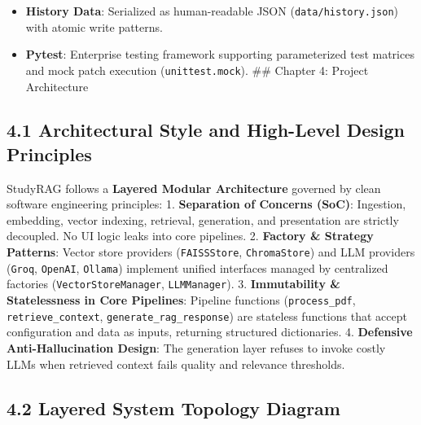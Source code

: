 \documentclass[
]{article}
\providecommand{\tightlist}{%
  \setlength{\itemsep}{0pt}\setlength{\parskip}{0pt}}
\begin{document}
\begin{itemize}
\tightlist
\item
  \textbf{History Data}: Serialized as human-readable JSON
  (\texttt{data/\allowbreak history.\allowbreak json}) with atomic write patterns.
\item
  \textbf{Pytest}: Enterprise testing framework supporting parameterized
  test matrices and mock patch execution (\texttt{unittest.\allowbreak mock}). \#\#
  Chapter 4: Project Architecture
\end{itemize}

\subsection{4.1 Architectural Style and High-Level Design
Principles}\label{architectural-style-and-high-level-design-principles}

StudyRAG follows a \textbf{Layered Modular Architecture} governed by
clean software engineering principles: 1. \textbf{Separation of Concerns
(SoC)}: Ingestion, embedding, vector indexing, retrieval, generation,
and presentation are strictly decoupled. No UI logic leaks into core
pipelines. 2. \textbf{Factory \& Strategy Patterns}: Vector store
providers (\texttt{FAISSStore}, \texttt{ChromaStore}) and LLM providers
(\texttt{Groq}, \texttt{OpenAI}, \texttt{Ollama}) implement unified
interfaces managed by centralized factories
(\texttt{VectorStoreManager}, \texttt{LLMManager}). 3.
\textbf{Immutability \& Statelessness in Core Pipelines}: Pipeline
functions (\texttt{process\_\allowbreak pdf}, \texttt{retrieve\_\allowbreak context},
\texttt{generate\_\allowbreak rag\_\allowbreak response}) are stateless functions that accept
configuration and data as inputs, returning structured dictionaries. 4.
\textbf{Defensive Anti-Hallucination Design}: The generation layer
refuses to invoke costly LLMs when retrieved context fails quality and
relevance thresholds.

\subsection{4.2 Layered System Topology
Diagram}\label{layered-system-topology-diagram}
\end{document}
